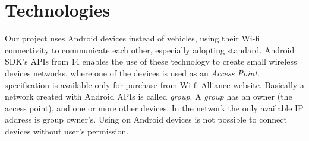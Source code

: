 \section{Technologies}

Our project uses Android devices instead of vehicles, using their Wi-fi connectivity to communicate each other, especially adopting \direct standard. Android SDK's APIs from 14 enables the use of these technology to create small wireless devices networks, where one of the devices is used as an \emph{Access Point}. \direct specification is available only for purchase from Wi-fi Alliance\textsuperscript{\texttrademark} website\cite{wifi_direct}.
Basically a network created with Android \direct APIs is called \emph{group}. A \emph{group} has an owner (the access point), and one or more other devices. In the network the only available IP address is group owner's. 
Using \direct on Android devices is not possible to connect devices without user's permission.
